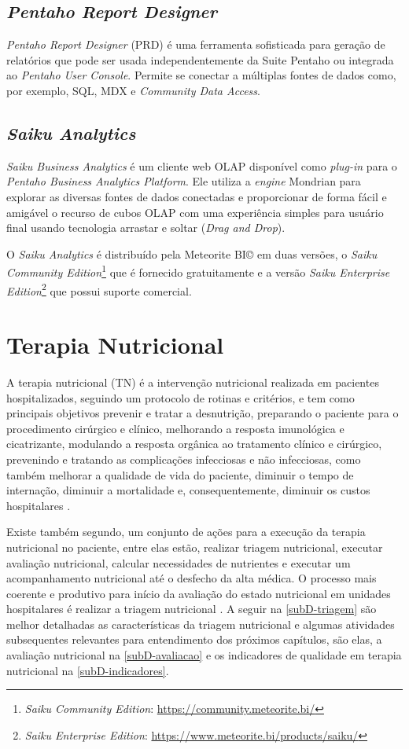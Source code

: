 \subsection{\textit{Pentaho Report Designer}}
\textit{Pentaho Report Designer} (PRD) é uma ferramenta sofisticada para geração de relatórios que pode ser usada independentemente da Suite Pentaho ou integrada ao \textit{Pentaho User Console}. Permite se conectar a múltiplas fontes de dados como, por exemplo, SQL, MDX e \textit{Community Data Access}.

\subsection{\textit{Saiku Analytics}}
\textit{Saiku Business Analytics} é um cliente web OLAP disponível como \textit{plug-in} para o \textit{Pentaho Business Analytics Platform}. Ele utiliza a \textit{engine} Mondrian para explorar as diversas fontes de dados conectadas e proporcionar de forma fácil e amigável o recurso de cubos OLAP com uma experiência simples para usuário final usando tecnologia arrastar e soltar (\textit{Drag and Drop}). 

O \textit{Saiku Analytics} é distribuído pela Meteorite BI© em duas versões, o \textit{Saiku Community Edition}\footnote{\textit{Saiku Community Edition}: \url{https://community.meteorite.bi/}} que é fornecido gratuitamente e a versão \textit{Saiku Enterprise Edition}\footnote{\textit{Saiku Enterprise Edition}: \url{https://www.meteorite.bi/products/saiku/}} que possui suporte comercial.

\section{Terapia Nutricional}
A terapia nutricional (TN) é a intervenção nutricional realizada em pacientes hospitalizados, seguindo um protocolo de rotinas e critérios, e tem como principais objetivos prevenir e tratar a desnutrição, preparando o paciente para o procedimento cirúrgico e clínico, melhorando a resposta imunológica e cicatrizante, modulando a resposta orgânica ao tratamento clínico e cirúrgico, prevenindo e tratando as complicações infecciosas e não infecciosas, como também melhorar a qualidade de vida do paciente, diminuir o tempo de internação, diminuir a mortalidade e, consequentemente, diminuir os custos hospitalares \cite{manualnutricao2016, mcclave2013}. 

Existe também segundo,  um conjunto de ações para a execução da terapia nutricional no paciente, entre elas estão, realizar triagem nutricional, executar avaliação nutricional, calcular necessidades de nutrientes e executar um acompanhamento nutricional até o desfecho da alta médica. O processo mais coerente e produtivo para início da avaliação do estado nutricional em unidades hospitalares é realizar a triagem nutricional \cite{protocolonutricionaladulto}. A seguir na \autoref{subD-triagem} são melhor detalhadas as características da triagem nutricional e algumas atividades subsequentes relevantes para entendimento dos próximos capítulos, são elas, a avaliação nutricional na \autoref{subD-avaliacao} e os indicadores de qualidade em terapia nutricional na \autoref{subD-indicadores}. 

